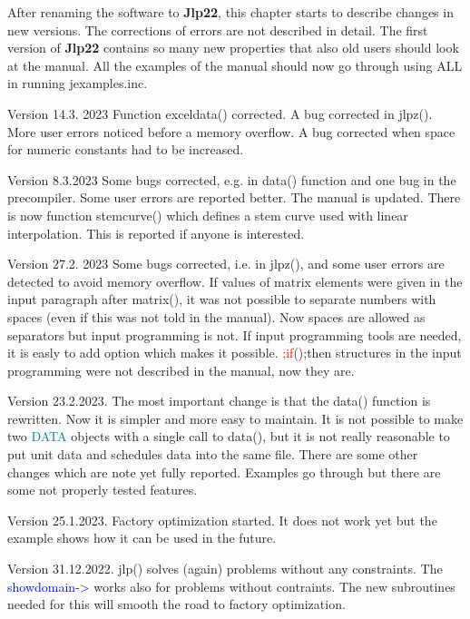 After renaming the software to \textbf{Jlp22}, this chapter starts to describe changes in new versions. 
The corrections of errors are not described in detail. The first version of \textbf{Jlp22} contains so many new properties that also old users 
should look at the manual. All the examples of the manual should now go through using ALL in running 
jexamples.inc. 
 
Version 14.3. 2023 Function \textcolor{VioletRed}{exceldata}() corrected. A bug corrected in \textcolor{VioletRed}{jlpz}(). 
More user errors noticed before a memory overflow. A bug corrected when space 
for numeric constants had to be increased. 
 
Version 8.3.2023 Some bugs corrected, e.g. in \textcolor{VioletRed}{data}() function and one bug in the precompiler. 
Some user errors are reported better. The manual is updated. There is 
now function stemcurve() which defines a stem curve used with linear interpolation. 
This is reported if anyone is interested. 
 
Version 27.2. 2023 Some bugs corrected, i.e. in \textcolor{VioletRed}{jlpz}(), and some user errors are detected 
to avoid memory overflow. If values of matrix elements were 
given 
in the input paragraph after \textcolor{VioletRed}{matrix}(), it was not possible to separate numbers with spaces (even if this was not 
told in the manual). Now spaces are allowed as separators but input programming is not. If 
input programming tools are needed, it is easly to add option which makes it possible. \textcolor{Red}{;if}();then 
structures in the input programming were not described in the manual, now they are. 
 
Version 23.2.2023. The most important change is that the \textcolor{VioletRed}{data}() function is rewritten. 
Now it is simpler and more easy to maintain. It is not possible to make two \textcolor{teal}{DATA} objects with 
a single call to \textcolor{VioletRed}{data}(), but it is not really reasonable to put unit data and schedules data 
into the same file. There are some other changes which are note yet fully reported. Examples go through 
but there are some not properly tested features. 
 
Version 25.1.2023. Factory optimization started. It does not work yet 
but the example shows how it can be used in the future. 
 
Version 31.12.2022. \textcolor{VioletRed}{jlp}() solves (again) problems without any constraints. 
The \textcolor{blue}{showdomain->} works also for problems without contraints. The new subroutines needed for this 
will smooth the road to factory optimization. 
 
